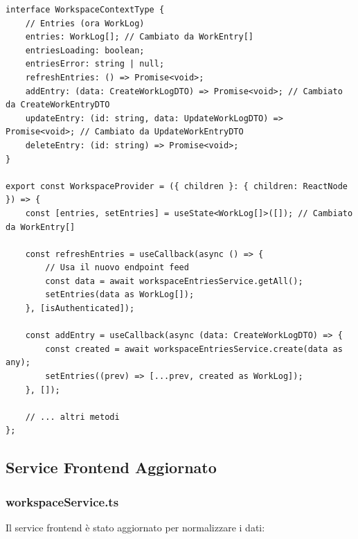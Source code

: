 \documentclass[11pt,a4paper]{article}
\begin{document}
\begin{lstlisting}[caption=WorkspaceContext Aggiornato]
interface WorkspaceContextType {
    // Entries (ora WorkLog)
    entries: WorkLog[]; // Cambiato da WorkEntry[]
    entriesLoading: boolean;
    entriesError: string | null;
    refreshEntries: () => Promise<void>;
    addEntry: (data: CreateWorkLogDTO) => Promise<void>; // Cambiato da CreateWorkEntryDTO
    updateEntry: (id: string, data: UpdateWorkLogDTO) => Promise<void>; // Cambiato da UpdateWorkEntryDTO
    deleteEntry: (id: string) => Promise<void>;
}

export const WorkspaceProvider = ({ children }: { children: ReactNode }) => {
    const [entries, setEntries] = useState<WorkLog[]>([]); // Cambiato da WorkEntry[]
    
    const refreshEntries = useCallback(async () => {
        // Usa il nuovo endpoint feed
        const data = await workspaceEntriesService.getAll();
        setEntries(data as WorkLog[]);
    }, [isAuthenticated]);
    
    const addEntry = useCallback(async (data: CreateWorkLogDTO) => {
        const created = await workspaceEntriesService.create(data as any);
        setEntries((prev) => [...prev, created as WorkLog]);
    }, []);
    
    // ... altri metodi
};
\end{lstlisting}

\subsection{Service Frontend Aggiornato}

\subsubsection{workspaceService.ts}

Il service frontend è stato aggiornato per normalizzare i dati:
\end{document}
